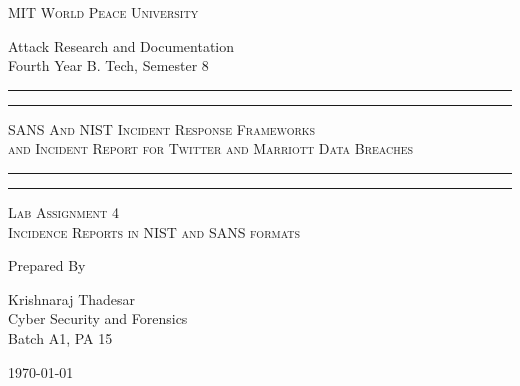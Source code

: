 \documentclass[11pt]{book}
\begin{document}
\begin{titlepage}
	\centering


	\huge\textsc{
		MIT World Peace University
	}\\

	\vspace{0.75\baselineskip} %

	\LARGE{
		Attack Research and Documentation\\
		Fourth Year B. Tech, Semester 8
	}

	\vfill %


	\rule{\textwidth}{1.6pt}\vspace*{-\baselineskip}\vspace*{2pt}
	\rule{\textwidth}{0.6pt}
	\vspace{0.75\baselineskip} %

	\huge{\textsc{
        SANS And NIST Incident Response Frameworks \\
		and Incident Report for Twitter and Marriott Data Breaches
        }} \\

	\vspace{0.5\baselineskip} %
	\rule{\textwidth}{0.6pt}\vspace*{-\baselineskip}\vspace*{2.8pt}
	\rule{\textwidth}{1.6pt}

	\vspace{1\baselineskip} %


	\LARGE\textsc{
		Lab Assignment 4 \\
        Incidence Reports in NIST and SANS formats
	} %
	\vfill


	Prepared By \vspace{0.5\baselineskip} %

	\Large{
		Krishnaraj Thadesar \\
		Cyber Security and Forensics\\
        Batch A1, PA 15
	}

	\vspace{0.5\baselineskip} %
	\today

\end{titlepage}
\end{document}
